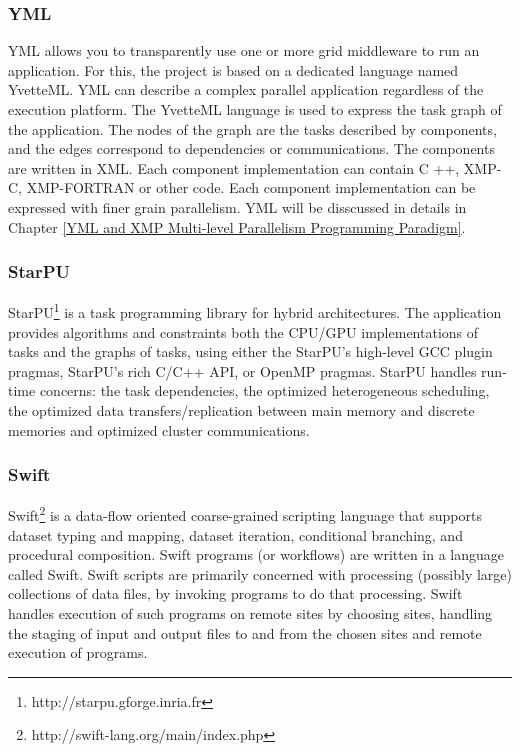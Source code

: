 \subsubsection{YML}

YML \cite{delannoyyml} allows you to transparently use one or more grid middleware to run an application. For this, the project is based on a dedicated language named YvetteML. YML can describe a complex parallel application regardless of the execution platform. The YvetteML language is used to express the task graph of the application. The nodes of the graph are the tasks described by components, and the edges correspond to dependencies or communications. The components are written in XML. Each component implementation can contain C ++, XMP-C, XMP-FORTRAN or other code. Each component implementation can be expressed with finer grain parallelism. YML will be disscussed in details in Chapter \ref{YML and XMP Multi-level Parallelism Programming Paradigm}.

\subsubsection{StarPU}

StarPU\footnote{http://starpu.gforge.inria.fr} \cite{augonnet2011starpu} is a task programming library for hybrid architectures. The application provides algorithms and constraints both the CPU/GPU implementations of tasks and the graphs of tasks, using either the StarPU's high-level GCC plugin pragmas, StarPU's rich C/C++ API, or OpenMP pragmas. StarPU handles run-time concerns: the task dependencies, the optimized heterogeneous scheduling, the optimized data transfers/replication between main memory and discrete memories and optimized cluster communications.

\subsubsection{Swift}

Swift\footnote{http://swift-lang.org/main/index.php} \cite{wilde2011swift} is a data-flow oriented coarse-grained scripting language that supports dataset typing and mapping, dataset iteration, conditional branching, and procedural composition. Swift programs (or workflows) are written in a language called Swift. Swift scripts are primarily concerned with processing (possibly large) collections of data files, by invoking programs to do that processing. Swift handles execution of such programs on remote sites by choosing sites, handling the staging of input and output files to and from the chosen sites and remote execution of programs.

